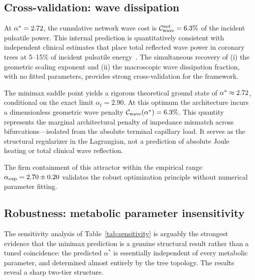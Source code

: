 \documentclass[11pt,a4paper]{article}
\theoremstyle{remark}
\begin{document}
\subsection{Cross-validation: wave dissipation}

At $\alpha^* = 2.72$, the cumulative network wave cost is
$\mathcal{C}^{\mathrm{net}}_{\mathrm{wave}} = 6.3\%$
of the incident pulsatile power.  This internal prediction is
quantitatively consistent with independent clinical estimates
that place total reflected wave power in coronary trees at
5--15\% of incident pulsatile
energy~\cite{Nichols2011,Westerhof1972}.  The simultaneous recovery of
(i) the geometric scaling exponent and (ii) the macroscopic wave
dissipation fraction, with no fitted parameters, provides strong
cross-validation for the framework.

The minimax saddle point yields a rigorous theoretical ground state of $\alpha^*
\approx 2.72$, conditional on the exact limit $\alpha_t = 2.90$. At
this optimum the architecture incurs a dimensionless geometric wave penalty
$\mathcal{C}_{\mathrm{wave}}(\alpha^*) = 6.3\%$. This quantity
represents the marginal architectural penalty of impedance mismatch across
bifurcations---isolated from the absolute terminal capillary load. It serves as
the structural regularizer in the Lagrangian, not a prediction of absolute Joule
heating or total clinical wave reflection.

The firm containment of this attractor within the empirical range
$\alpha_{\mathrm{exp}} = 2.70 \pm 0.20$ validates the robust
optimization principle without numerical parameter fitting.

\subsection{Robustness: metabolic parameter insensitivity}

The sensitivity analysis of Table~\ref{tab:sensitivity} is arguably the
strongest evidence that the minimax prediction is a genuine structural result
rather than a tuned coincidence: the predicted $\alpha^*$ is essentially
independent of every metabolic parameter, and determined almost entirely by the
tree topology.
The results reveal a sharp two-tier structure.
\end{document}

